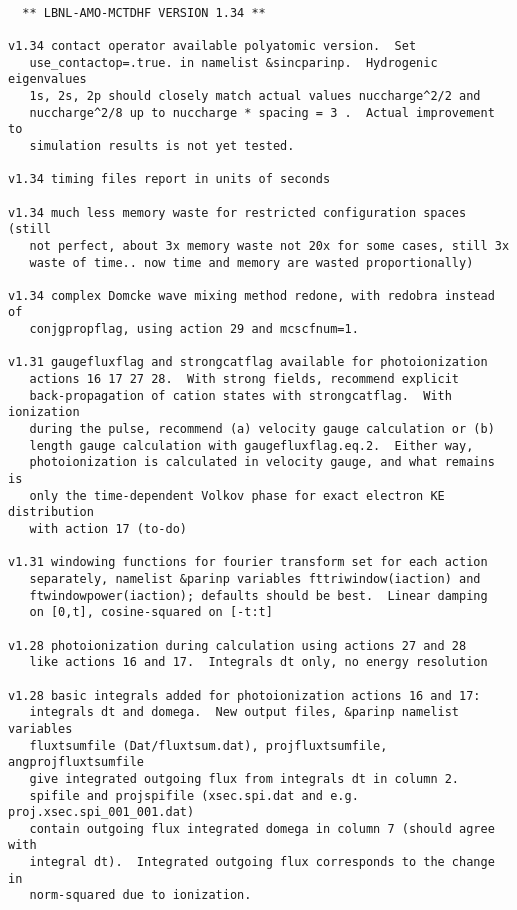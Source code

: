 \begin{verbatim}

  ** LBNL-AMO-MCTDHF VERSION 1.34 **

v1.34 contact operator available polyatomic version.  Set 
   use_contactop=.true. in namelist &sincparinp.  Hydrogenic eigenvalues
   1s, 2s, 2p should closely match actual values nuccharge^2/2 and 
   nuccharge^2/8 up to nuccharge * spacing = 3 .  Actual improvement to 
   simulation results is not yet tested.
 
v1.34 timing files report in units of seconds

v1.34 much less memory waste for restricted configuration spaces (still
   not perfect, about 3x memory waste not 20x for some cases, still 3x
   waste of time.. now time and memory are wasted proportionally)

v1.34 complex Domcke wave mixing method redone, with redobra instead of 
   conjgpropflag, using action 29 and mcscfnum=1.  

v1.31 gaugefluxflag and strongcatflag available for photoionization
   actions 16 17 27 28.  With strong fields, recommend explicit 
   back-propagation of cation states with strongcatflag.  With ionization 
   during the pulse, recommend (a) velocity gauge calculation or (b) 
   length gauge calculation with gaugefluxflag.eq.2.  Either way, 
   photoionization is calculated in velocity gauge, and what remains is 
   only the time-dependent Volkov phase for exact electron KE distribution 
   with action 17 (to-do)

v1.31 windowing functions for fourier transform set for each action
   separately, namelist &parinp variables fttriwindow(iaction) and 
   ftwindowpower(iaction); defaults should be best.  Linear damping 
   on [0,t], cosine-squared on [-t:t]

v1.28 photoionization during calculation using actions 27 and 28
   like actions 16 and 17.  Integrals dt only, no energy resolution

v1.28 basic integrals added for photoionization actions 16 and 17:
   integrals dt and domega.  New output files, &parinp namelist variables
   fluxtsumfile (Dat/fluxtsum.dat), projfluxtsumfile, angprojfluxtsumfile 
   give integrated outgoing flux from integrals dt in column 2.
   spifile and projspifile (xsec.spi.dat and e.g. proj.xsec.spi_001_001.dat)
   contain outgoing flux integrated domega in column 7 (should agree with 
   integral dt).  Integrated outgoing flux corresponds to the change in 
   norm-squared due to ionization.


\end{verbatim}
